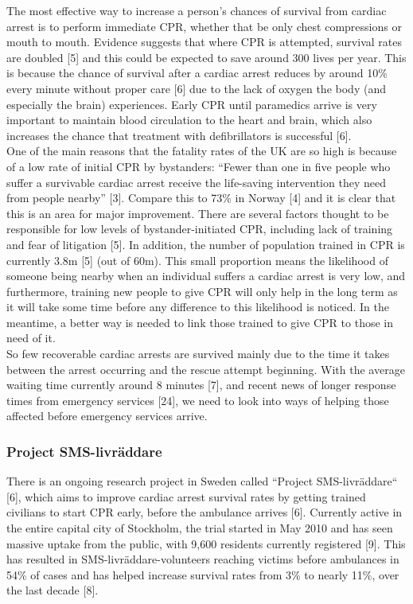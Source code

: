 \documentclass{article}
\begin{document}
The most effective way to increase a person’s chances of survival from cardiac arrest is to perform immediate CPR, whether that be only chest compressions or mouth to mouth. Evidence suggests that where CPR is attempted, survival rates are doubled [5] and this could be expected to save around 300 lives per year. This is because the chance of survival after a cardiac arrest reduces by around 10\% every minute without proper care [6] due to the lack of oxygen the body (and especially the brain) experiences. Early CPR until paramedics arrive is very important to maintain blood circulation to the heart and brain, which also increases the chance that treatment with defibrillators is successful [6].\\

One of the main reasons that the fatality rates of the UK are so high is because of a low rate of initial CPR by bystanders: “Fewer than one in five people who suffer a survivable cardiac arrest receive the life-saving intervention they need from people nearby” [3]. Compare this to 73\% in Norway [4] and it is clear that this is an area for major improvement. There are several factors thought to be responsible for low levels of bystander-initiated CPR, including lack of training and fear of litigation [5]. In addition, the number of population trained in CPR is currently 3.8m [5] (out of 60m). This small proportion means the likelihood of someone being nearby when an individual suffers a cardiac arrest is very low, and furthermore, training new people to give CPR will only help in the long term as it will take some time before any difference to this likelihood is noticed. In the meantime, a better way is needed to link those trained to give CPR to those in need of it.\\

So few recoverable cardiac arrests are survived mainly due to the time it takes between the arrest occurring and the rescue attempt beginning. With the average waiting time currently around 8 minutes [7], and recent news of longer response times from emergency services [24], we need to look into ways of helping those affected before emergency services arrive.\\
		\subsubsection{Project SMS-livräddare}
		
		There is an ongoing research project in Sweden called “Project SMS-livräddare“ [6], which aims to improve cardiac arrest survival rates by getting trained civilians to start CPR early, before the ambulance arrives [6]. Currently active in the entire capital city of Stockholm, the trial started in May 2010 and has seen massive uptake from the public, with 9,600 residents currently registered [9]. This has resulted in SMS-livräddare-volunteers reaching victims before ambulances in 54\% of cases and has helped increase survival rates from 3\% to nearly 11\%, over the last decade [8].\\
\end{document}
